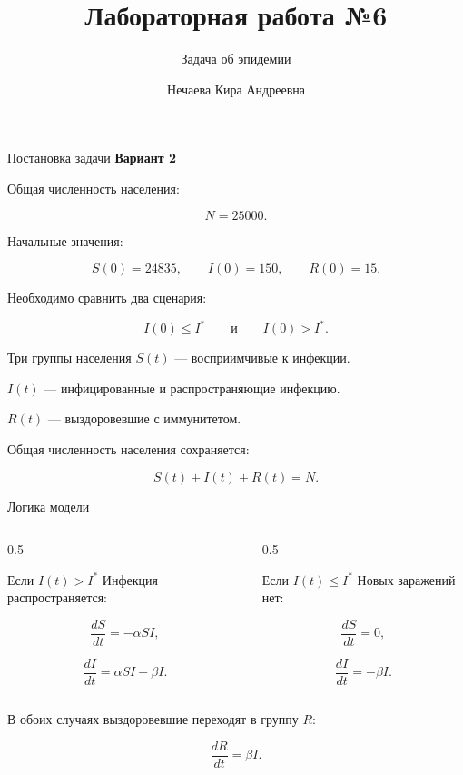 \documentclass[
  10pt,
  ignorenonframetext,
  aspectratio=169,
  russian,
]{beamer}
\title{\texorpdfstring{Лабораторная работа №6}{Лабораторная работа №6}}
\subtitle{\texorpdfstring{Задача об эпидемии}{Задача об эпидемии}}
\author{Нечаева Кира Андреевна}
\date{}
\institute{НКНбд-01-23}
\begin{document}
\frame{\titlepage}


\begin{frame}{Постановка задачи}
\protect{}\label{ux43fux43eux441ux442ux430ux43dux43eux432ux43aux430-ux437ux430ux434ux430ux447ux438}
\textbf{Вариант 2}

Общая численность населения:

\[
N=25000.
\]

Начальные значения:

\[
S(0)=24835,
\qquad
I(0)=150,
\qquad
R(0)=15.
\]

Необходимо сравнить два сценария:

\[
I(0)\le I^*
\qquad \text{и} \qquad
I(0)>I^*.
\]
\end{frame}

\begin{frame}{Три группы населения}
\protect{}\label{ux442ux440ux438-ux433ux440ux443ux43fux43fux44b-ux43dux430ux441ux435ux43bux435ux43dux438ux44f}
\textbf{\(S(t)\)} --- восприимчивые к инфекции.

\textbf{\(I(t)\)} --- инфицированные и распространяющие инфекцию.

\textbf{\(R(t)\)} --- выздоровевшие с иммунитетом.

Общая численность населения сохраняется:

\[
S(t)+I(t)+R(t)=N.
\]
\end{frame}

\begin{frame}{Логика модели}
\protect{}\label{ux43bux43eux433ux438ux43aux430-ux43cux43eux434ux435ux43bux438}
\begin{columns}[T]
\begin{column}{0.5\linewidth}
\begin{block}{Если \(I(t)>I^*\)}
\protect{}\label{ux435ux441ux43bux438-iti}
Инфекция распространяется:

\[
\frac{dS}{dt}=-\alpha SI,
\]

\[
\frac{dI}{dt}=\alpha SI-\beta I.
\]
\end{block}
\end{column}

\begin{column}{0.5\linewidth}
\begin{block}{Если \(I(t)\le I^*\)}
\protect{}\label{ux435ux441ux43bux438-itle-i}
Новых заражений нет:

\[
\frac{dS}{dt}=0,
\]

\[
\frac{dI}{dt}=-\beta I.
\]
\end{block}
\end{column}
\end{columns}

В обоих случаях выздоровевшие переходят в группу \(R\):

\[
\frac{dR}{dt}=\beta I.
\]
\end{frame}
\end{document}
